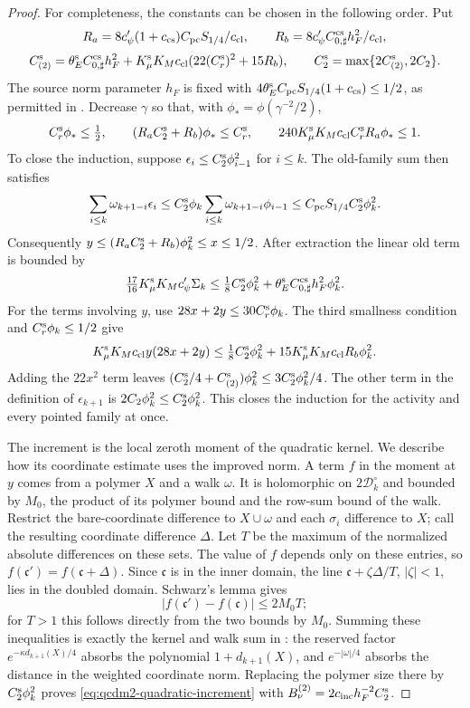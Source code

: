 \documentclass[11pt,letterpaper,reqno]{amsart}
\theoremstyle{definition}
\theoremstyle{remark}
\begin{document}
\begin{proof}
For completeness, the constants can be chosen in the following
order.  Put
\[
 R_a=8c'_\psi(1+c_{\rm cs})C_{\rm pc}S_{1/4}/c_{\rm cl},
 \qquad R_b=8c'_\psi C_{0,\sharp}^{\rm cs}h_F^2/c_{\rm cl},
\]
\[
 C_{(2)}^{\rm s}=\theta_E^{\rm s}C_{0,\sharp}^{\rm cs}h_F^2
  +K_\mu^{\rm s}K_Mc_{\rm cl}(22(C_r^{\rm s})^2+15R_b),
 \qquad C_2^{\rm s}=\max\{2C_{(2)}^{\rm s},2C_2\}.
\]
The source norm parameter $h_F$ is fixed with
$4\theta_E^{\rm s}C_{\rm pc}S_{1/4}(1+c_{\rm cs})\le1/2$,
as permitted in \cite[Prop. 10.20]{QCDM1}.  Decrease
$\gamma$ so that, with $\phi_* =\phi(\gamma^{-2}/2)$,
\[
 C_r^{\rm s}\phi_*\le\tfrac12,\qquad
 (R_aC_2^{\rm s}+R_b)\phi_*\le C_r^{\rm s},\qquad
 240K_\mu^{\rm s}K_Mc_{\rm cl}C_r^{\rm s}R_a\phi_*\le1.
\]
To close the induction, suppose
$\epsilon_i\le C_2^{\rm s}\phi_{i-1}^2$ for $i\le k$.
The old-family sum then satisfies
\[
 \sum_{i\le k}\omega_{k+1-i}\epsilon_i
 \le C_2^{\rm s}\phi_k
                  \sum_{i\le k}\omega_{k+1-i}\phi_{i-1}
 \le C_{\rm pc}S_{1/4}C_2^{\rm s}\phi_k^2.
\]
Consequently $y\le(R_aC_2^{\rm s}+R_b)\phi_k^2\le x\le1/2$.
After extraction the linear old term is bounded by
\[
 \tfrac{17}{16}K_\mu^{\rm s}K_Mc'_\psi\Sigma_k
 \le\tfrac18C_2^{\rm s}\phi_k^2
                 +\theta_E^{\rm s}C_{0,\sharp}^{\rm cs}h_F^2\phi_k^2.
\]
For the terms involving $y$, use $28x+2y\le30C_r^{\rm s}\phi_k$.
The third smallness condition and $C_r^{\rm s}\phi_k\le1/2$ give
\[
 K_\mu^{\rm s}K_Mc_{\rm cl}y(28x+2y)
 \le\tfrac18C_2^{\rm s}\phi_k^2
                      +15K_\mu^{\rm s}K_Mc_{\rm cl}R_b\phi_k^2.
\]
Adding the $22x^2$ term leaves
$(C_2^{\rm s}/4+C_{(2)}^{\rm s})\phi_k^2
\le3C_2^{\rm s}\phi_k^2/4$.
The other term in the definition of $\epsilon_{k+1}$ is
$2C_2\phi_k^2\le C_2^{\rm s}\phi_k^2$.
This closes the induction for the activity and every
pointed family at once.

The increment is the local zeroth moment of the quadratic
kernel.  We describe how its coordinate estimate uses the
improved norm.  A term $f$ in the moment at $y$ comes
from a polymer $X$ and a walk $\omega$.  It is holomorphic
on $2\mathscr D_k^\circ$ and bounded by $M_0$, the
product of its polymer bound and the row-sum bound of
the walk.  Restrict the bare-coordinate difference to
$X\cup\omega$ and each $\sigma_i$ difference to $X$;
call the resulting coordinate difference $\Delta$.
Let $T$ be the maximum of the normalized absolute
differences on these sets.  The value of $f$ depends
only on these entries, so
$f(\mathfrak c')=f(\mathfrak c+\Delta)$.
Since $\mathfrak c$ is in the inner domain, the line
$\mathfrak c+\zeta\Delta/T$, $|\zeta|<1$, lies in the
doubled domain.  Schwarz's lemma gives
\[
 |f(\mathfrak c')-f(\mathfrak c)|\le2M_0T;
\]
for $T>1$ this follows directly from the two bounds by
$M_0$.  Summing these inequalities is exactly the
kernel and walk sum in \cite[Prop. 10.1]{QCDM1}:
the reserved factor $e^{-\kappa d_{k+1}(X)/4}$ absorbs
the polynomial $1+d_{k+1}(X)$, and $e^{-|\omega|/4}$
absorbs the distance in the weighted coordinate norm.
Replacing the polymer size there by $C_2^{\rm s}\phi_k^2$
proves \eqref{eq:qcdm2-quadratic-increment} with
$B_\nu^{(2)}=2c_{\rm inc}h_F^{-2}C_2^{\rm s}$.


\end{proof}
\end{document}
